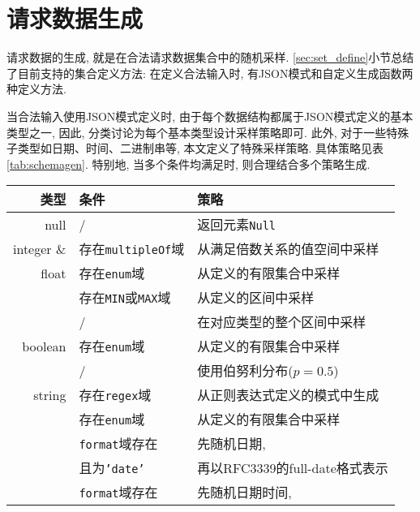     \section{请求数据生成}
        \label{sec:req_data_gen}
    
        请求数据的生成, 就是在合法请求数据集合中的随机采样. \ref{sec:set_define}小节总结了目前支持的集合定义方法: 在定义合法输入时, 有JSON模式和自定义生成函数两种定义方法.
        
        当合法输入使用JSON模式定义时, 由于每个数据结构都属于JSON模式定义的基本类型之一, 因此, 分类讨论为每个基本类型设计采样策略即可. 此外, 对于一些特殊子类型如日期、时间、二进制串等, 本文定义了特殊采样策略. 具体策略见表\ref{tab:schemagen}. 特别地, 当多个条件均满足时, 则合理结合多个策略生成.
        
        \begin{table}[!htb]
            \centering
            \begin{tabular}{rll}
                \toprule
                类型 & 条件 & 策略 \\
                \midrule
                null & / & 返回元素\texttt{Null} \\
                \hline
                integer \& & 存在\texttt{multipleOf}域 & 从满足倍数关系的值空间中采样 \\
                \cline{2-3}
                float & 存在\texttt{enum}域 & 从定义的有限集合中采样 \\
                \cline{2-3}
                & 存在\texttt{MIN}或\texttt{MAX}域 & 从定义的区间中采样 \\
                \cline{2-3}
                & / & 在对应类型的整个区间中采样 \\
                \hline
                boolean & 存在\texttt{enum}域 & 从定义的有限集合中采样 \\
                \cline{2-3}
                & / & 使用伯努利分布($p=0.5$) \\
                \hline
                string & 存在\texttt{regex}域 & 从正则表达式定义的模式中生成 \\
                \cline{2-3}
                & 存在\texttt{enum}域 & 从定义的有限集合中采样 \\
                \cline{2-3}
                & \texttt{format}域存在 & 先随机日期, \\
                & 且为\texttt{'date'} & 再以RFC3339的full-date格式表示 \\
                \cline{2-3}
                & \texttt{format}域存在 & 先随机日期时间, \\

\end{tabular}
\end{table}
